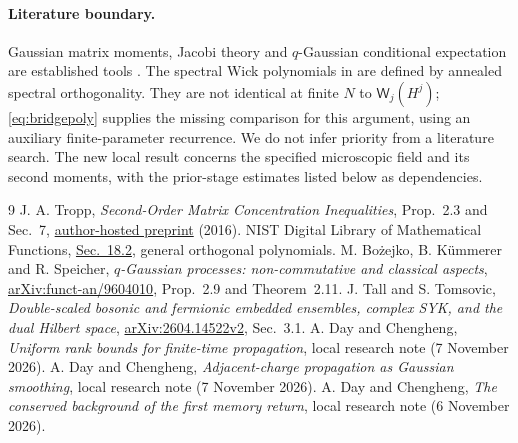\documentclass[11pt,a4paper]{article}
\newcommand{\W}{\mathsf W}
\begin{document}
\paragraph{Literature boundary.}
Gaussian matrix moments, Jacobi theory and $q$-Gaussian conditional
expectation are established tools \cite{Tropp,DLMF,BKS}. The
spectral Wick polynomials in \cite{Tall} are defined by annealed
spectral orthogonality. They are not identical at finite $N$ to
$\W_j(H^j)$; \eqref{eq:bridgepoly} supplies the missing comparison
for this argument, using an auxiliary finite-parameter recurrence.
We do not infer priority from a literature search. The new local
result concerns the specified microscopic field and its second
moments, with the prior-stage estimates listed below as dependencies.

\begin{thebibliography}{9}
 J. A. Tropp, \emph{Second-Order Matrix Concentration
Inequalities}, Prop.~2.3 and Sec.~7,
\href{https://tropp.caltech.edu/papers/Tro16-Second-Order-Matrix-preprint.pdf}{author-hosted preprint} (2016).
 NIST Digital Library of Mathematical Functions,
\href{https://dlmf.nist.gov/18.2}{Sec.~18.2}, general orthogonal polynomials.
 M. Bo\.{z}ejko, B. K\"ummerer and R. Speicher,
\emph{$q$-Gaussian processes: non-commutative and classical aspects},
\href{https://arxiv.org/abs/funct-an/9604010}{arXiv:funct-an/9604010},
Prop.~2.9 and Theorem~2.11.
 J. Tall and S. Tomsovic, \emph{Double-scaled bosonic
and fermionic embedded ensembles, complex SYK, and the dual Hilbert space},
\href{https://arxiv.org/abs/2604.14522}{arXiv:2604.14522v2}, Sec.~3.1.
 A. Day and Chengheng, \emph{Uniform rank bounds for
finite-time propagation}, local research note (7 November 2026).
 A. Day and Chengheng, \emph{Adjacent-charge
propagation as Gaussian smoothing}, local research note (7 November 2026).
 A. Day and Chengheng, \emph{The conserved background
of the first memory return}, local research note (6 November 2026).
\end{thebibliography}
\end{document}
